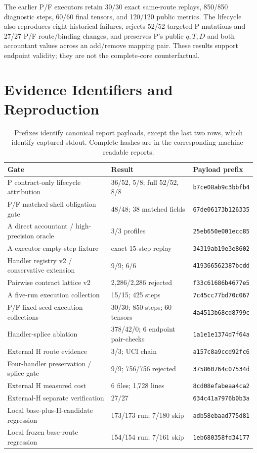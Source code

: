 \documentclass[letterpaper]{article}
\begin{document}
The earlier P/F executors retain 30/30 exact same-route replays, 850/850
diagnostic steps, 60/60 final tensors, and 120/120 public metrics.  The
lifecycle also reproduces eight historical failures, rejects 52/52 targeted P
mutations and 27/27 P/F route/binding changes, and preserves P's public
$q,T,D$ and both accountant values across an add/remove mapping pair.  These
results support endpoint validity; they are not the complete-core
counterfactual.

\section{Evidence Identifiers and Reproduction}
\label{sec:reproduce}

\begin{table}[t]
\centering
\footnotesize
\setlength{\tabcolsep}{4pt}
\begin{tabular}{@{}p{}p{}p{}@{}}
\toprule
Gate & Result & Payload prefix \\
\midrule
P contract-only lifecycle attribution & 36/52, 5/8; full 52/52, 8/8 &
\texttt{b7ce08ab9c3bbfb4} \\
P/F matched-shell obligation gate & 48/48; 38 matched fields &
\texttt{67de06173b126335} \\
A direct accountant / high-precision oracle & 3/3 profiles &
\texttt{25eb650e001ecc85} \\
A executor empty-step fixture & exact 15-step replay &
\texttt{34319ab19e3e8602} \\
Handler registry v2 / conservative extension & 9/9; 6/6 &
\texttt{419366562387bcdd} \\
Pairwise contract lattice v2 & 2,286/2,286 rejected &
\texttt{f33c61686b4677e5} \\
A five-run execution collection & 15/15; 425 steps &
\texttt{7c45cc77bd70c067} \\
P/F fixed-seed execution collections & 30/30; 850 steps; 60 tensors &
\texttt{4a4513b68cd8799c} \\
Handler-splice ablation & 378/42/0; 6 endpoint pair-checks &
\texttt{1a1e1e1374d7f64a} \\
External H route evidence & 3/3; UCI chain &
\texttt{a157c8a9ccd92fc6} \\
Four-handler preservation / splice gate & 9/9; 756/756 rejected &
\texttt{375860764c07534d} \\
External H measured cost & 6 files; 1,728 lines &
\texttt{8cd08efabeaa4ca2} \\
External-H separate verification & 27/27 &
\texttt{634c41a7976b0b3a} \\
Local base-plus-H-candidate regression & 173/173 run; 7/180 skip &
\texttt{adb58ebaad775d81} \\
Local frozen base-route regression & 154/154 run; 7/161 skip &
\texttt{1eb680358fd34177} \\
\bottomrule
\end{tabular}
\caption{Prefixes identify canonical report payloads, except the last two
rows, which identify captured stdout.  Complete hashes are in the
corresponding machine-readable reports.}
\label{tab:supp-evidence}
\end{table}
\end{document}
